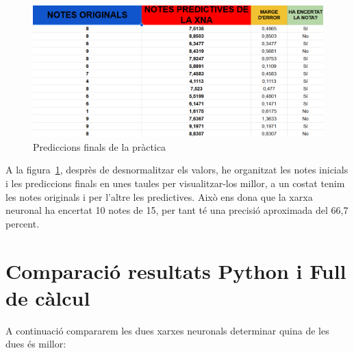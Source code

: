 \begin{figure}[h]
    \centering
    \includegraphics[width=1\textwidth]{./figures/Resultat_final.png}
    \caption{Prediccions finals de la pràctica}
    \label{f:resulat_full}
\end{figure}

A la figura~\ref{f:resulat_full}, desprès de desnormalitzar els valors, he organitzat les notes inicials i les prediccions finals en unes taules per visualitzar-los millor, a un costat tenim les notes originals i per l'altre les predictives.
Això ens dona que la xarxa neuronal ha encertat 10 notes de 15, per tant té una precisió aproximada del 66,7 percent.

\section{Comparació resultats Python i Full de càlcul}

A continuació compararem les dues xarxes neuronals determinar quina de les dues és millor:

